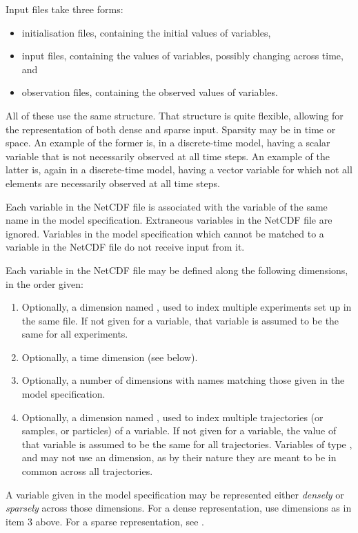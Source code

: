 Input files take three forms:
\begin{itemize}
\item initialisation files, containing the initial values of 
  variables,
\item input files, containing the values of  variables, possibly
  changing across time, and
\item observation files, containing the observed values of 
  variables.
\end{itemize}
All of these use the same structure. That structure is quite flexible,
allowing for the representation of both dense and sparse input. Sparsity may
be in time or space. An example of the former is, in a discrete-time model,
having a scalar  variable that is not necessarily observed at all
time steps. An example of the latter is, again in a discrete-time model,
having a vector  variable for which not all elements are necessarily
observed at all time steps.

Each variable in the NetCDF file is associated with the variable of the same
name in the model specification. Extraneous variables in the NetCDF file are
ignored. Variables in the model specification which cannot be matched to a
variable in the NetCDF file do not receive input from it.

Each variable in the NetCDF file may be defined along the following
dimensions, in the order given:
\begin{enumerate}
\item Optionally, a dimension named , used to index multiple
  experiments set up in the same file. If not given for a variable, that
  variable is assumed to be the same for all experiments.
\item Optionally, a time dimension (see below).
\item Optionally, a number of dimensions with names matching those given in
  the model specification.
\item Optionally, a dimension named , used to index multiple
  trajectories (or samples, or particles) of a variable. If not given for a
  variable, the value of that variable is assumed to be the same for all
  trajectories. Variables of type ,  and 
  may not use an  dimension, as by their nature they are meant to be
  in common across all trajectories.
\end{enumerate}

A variable given in the model specification may be represented either
\emph{densely} or \emph{sparsely} across those dimensions. For a dense
representation, use dimensions as in item 3 above. For a sparse
representation, see .

